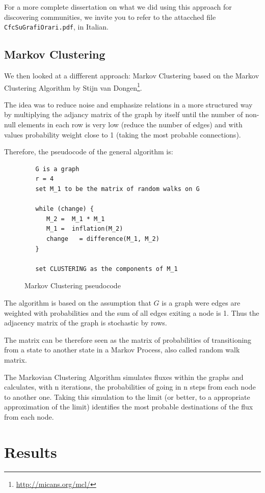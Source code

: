 \documentclass[12pt,a4paper]{article}
\begin{document}
For a more complete dissertation on what we did using this approach for discovering communities, we invite you to refer to the attacched file \texttt{CfcSuGrafiOrari.pdf}, in Italian.

\subsection{Markov Clustering}

We then looked at a diffferent approach: Markov Clustering based on the Markov Clustering Algorithm by Stijn van Dongen\footnote{\url{http://micans.org/mcl/}}.

The idea was to reduce noise and emphasize relations in a more structured way
by multiplying the adjancy matrix of the graph by itself until the number of
non-null elements in each row is very low (reduce the number of edges) and with
values probability weight close to 1 (taking the most probable connections).

Therefore, the pseudocode of the general algorithm is:
\begin{figure}
\begin{verbatim}
   G is a graph
   r = 4
   set M_1 to be the matrix of random walks on G

   while (change) {
      M_2 =  M_1 * M_1
      M_1 =  inflation(M_2)
      change   = difference(M_1, M_2)
   }

   set CLUSTERING as the components of M_1
\end{verbatim}
\caption{Markov Clustering pseudocode}
\end{figure}

The algorithm is based on the assumption that $G$ is a graph
were edges are weighted with probabilities and the sum
of all edges exiting a node is 1. Thus the adjacency matrix
of the graph is stochastic by rows.

The matrix can be therefore seen as the matrix of probabilities
of transitioning from a state to another state in
a Markov Process, also called random walk matrix.

The Markovian Clustering Algorithm simulates fluxes within the
graphs and calculates, with n iterations, the probabilities of going in
n steps from each node to another one. Taking this simulation to the limit
(or better, to a appropriate approximation of the limit) identifies
the most probable destinations of the flux from each node.



\section{Results}
\label{results}
\end{document}
